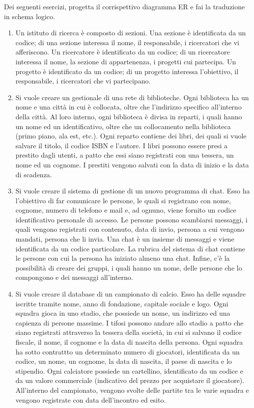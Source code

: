 \documentclass{article}
\begin{document}
\begin{center}
\end{center}

Dei seguenti esercizi, progetta il corrispettivo diagramma ER e fai la traduzione in schema logico.
\begin{enumerate}
	\item Un istituto di ricerca è composto di sezioni. Una sezione è identificata da un codice; di una sezione interessa il nome, il responsabile, i ricercatori che vi afferiscono. Un ricercatore è identificato da un codice; di un ricercatore interessa il nome, la sezione di appartenenza, i progetti cui partecipa. Un progetto è identificato da un codice; di un progetto interessa l'obiettivo, il responsabile, i ricercatori che vi partecipano.
	\item Si vuole creare un gestionale di una rete di biblioteche. Ogni biblioteca ha un nome e una città in cui è collocata, oltre che l'indirizzo specifico all'interno della città. Al loro interno, ogni biblioteca è divisa in reparti, i quali hanno un nome ed un identificativo, oltre che un collocamento nella biblioteca (primo piano, ala est, etc.). Ogni reparto contiene dei libri, dei quali si vuole salvare il titolo, il codice ISBN e l'autore. I libri possono essere presi a prestito dagli utenti, a patto che essi siano registrati con una tessera, un nome ed un cognome. I prestiti vengono salvati con la data di inizio e la data di scadenza.
	\item Si vuole creare il sistema di gestione di un nuovo programma di chat. Esso ha l'obiettivo di far comunicare le persone, le quali si registrano con nome, cognome, numero di telefono e mail e, ad ognuno, viene fornito un codice identificativo personale di accesso. Le persone possono scambiarsi messaggi, i quali vengono registrati con contenuto, data di invio, persona a cui vengono mandati, persona che li invia. Una chat è un insieme di messaggi e viene identificata da un codice particolare. La rubrica del sistema di chat contiene le persone con cui la persona ha iniziato almeno una chat. Infine, c'è la possibilità di creare dei gruppi, i quali hanno un nome, delle persone che lo compongono e dei messaggi all'interno.
	\item Si vuole creare il database di un campionato di calcio. Esso ha delle squadre iscritte tramite nome, anno di fondazione, capitale sociale e logo. Ogni squadra gioca in uno stadio, che possiede un nome, un indirizzo ed una capienza di persone massime. I tifosi possono andare allo stadio a patto che siano registrati attraverso la tessera della società, in cui si salvano il codice fiscale, il nome, il cognome e la data di nascita della persona. Ogni squadra ha sotto contrattto un determinato numero di giocatori, identificata da un codice, un nome, un cognome, la data di nascita, il paese di nascita e lo stipendio. Ogni calciatore possiede un cartellino, identificato da un codice e da un valore commerciale (indicativo del prezzo per acquistare il giocatore). All'interno del campionato, vengono svolte delle partite tra le varie squadra e vengono registrate con data dell'incontro ed esito.
\end{enumerate}
	
\end{document}
